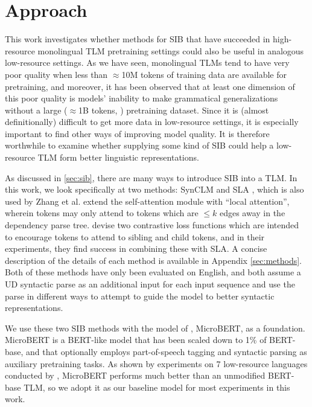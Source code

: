 \documentclass[11pt]{article}
\begin{document}
\section{Approach}
This work investigates whether methods for SIB that have succeeded in high-resource monolingual TLM pretraining settings could also be useful in analogous low-resource settings.
As we have seen, monolingual TLMs tend to have very poor quality when less than $\approx$10M tokens of training data are available for pretraining, and moreover, it has been observed that at least one dimension of this poor quality is models' inability to make grammatical generalizations without a large ($\approx$1B tokens, \citealt{warstadt_learning_2020}) pretraining dataset.
Since it is (almost definitionally) difficult to get more data in low-resource settings, it is especially important to find other ways of improving model quality. 
It is therefore worthwhile to examine whether supplying some kind of SIB could help a low-resource TLM form better linguistic representations.

As discussed in \cref{sec:sib}, there are many ways to introduce SIB into a TLM.
In this work, we look specifically at two methods: SynCLM \citep{zhang-etal-2022-syntax} and SLA \citep{li-etal-2021-improving-bert}, which is also used by Zhang et al.
\citet{li-etal-2021-improving-bert} extend the self-attention module with ``local attention'', wherein tokens may only attend to tokens which are $\leq k$ edges away in the dependency parse tree.
\citet{zhang-etal-2022-syntax} devise two contrastive loss functions which are intended to encourage tokens to attend to sibling and child tokens, and in their experiments, they find success in combining these with SLA.
A concise description of the details of each method is available in Appendix \ref{sec:methods}.%
Both of these methods have only been evaluated on English, and both assume a UD syntactic parse as an additional input for each input sequence and use the parse in different ways to attempt to guide the model to better syntactic representations.

We use these two SIB methods with the model of \citet{gessler-zeldes-2022-microbert}, MicroBERT, as a foundation.
MicroBERT is a BERT-like model that has been scaled down to 1\% of BERT-base, and that optionally employs part-of-speech tagging and syntactic parsing as auxiliary pretraining tasks.
As shown by experiments on 7 low-resource languages conducted by \citet{gessler-zeldes-2022-microbert}, MicroBERT performs much better than an unmodified \mbox{BERT-base} TLM, so we adopt it as our baseline model for most experiments in this work.
\end{document}
